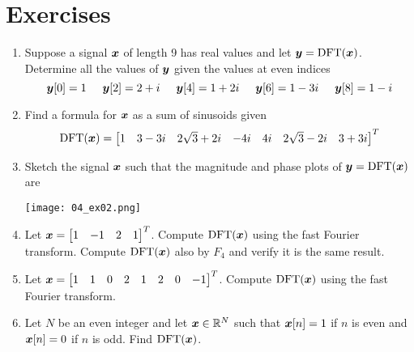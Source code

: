 \section{Exercises}

\begin{enumerate}[leftmargin=*]
\item Suppose a signal $\boldsymbol{x}$ of length 9 has real values and let $\boldsymbol{y} = \mathrm{DFT}(\boldsymbol{x})$. Determine all the values of $\boldsymbol{y}$ given the values at even indices
$$
\boldsymbol{y}[0] = 1 \hspace{5mm}
\boldsymbol{y}[2] = 2+i \hspace{5mm}
\boldsymbol{y}[4] = 1+2i \hspace{5mm}
\boldsymbol{y}[6] = 1-3i \hspace{5mm}
\boldsymbol{y}[8] = 1-i
$$
\item Find a formula for $\boldsymbol{x}$ as a sum of sinusoids given
$$
\mathrm{DFT}(\boldsymbol{x}) = \begin{bmatrix} 1 & 3-3i & 2\sqrt{3}+2i& -4i& 4i &2\sqrt{3}-2i & 3+3i \end{bmatrix}^T
$$
\item Sketch the signal $\boldsymbol{x}$ such that the magnitude and phase plots of $\boldsymbol{y} = \mathrm{DFT}(\boldsymbol{x})$ are
\begin{center}
\texttt{[image: 04\_ex02.png]}
\end{center}
\item Let $\boldsymbol{x} = \begin{bmatrix} 1 & -1 & 2 & 1 \end{bmatrix}^T$. Compute $\mathrm{DFT}(\boldsymbol{x})$ using the fast Fourier transform. Compute $\mathrm{DFT}(\boldsymbol{x})$ also by $F_4$ and verify it is the same result.
\item Let $\boldsymbol{x} = \begin{bmatrix} 1 & 1 & 0 & 2 & 1 & 2 & 0 & -1 \end{bmatrix}^T$. Compute $\mathrm{DFT}(\boldsymbol{x})$ using the fast Fourier transform.
\item Let $N$ be an even integer and let $\boldsymbol{x} \in \mathbb{R}^N$ such that $\boldsymbol{x}[n] = 1$ if $n$ is even and $\boldsymbol{x}[n] = 0$ if $n$ is odd. Find $\mathrm{DFT}(\boldsymbol{x})$.

\end{enumerate}
